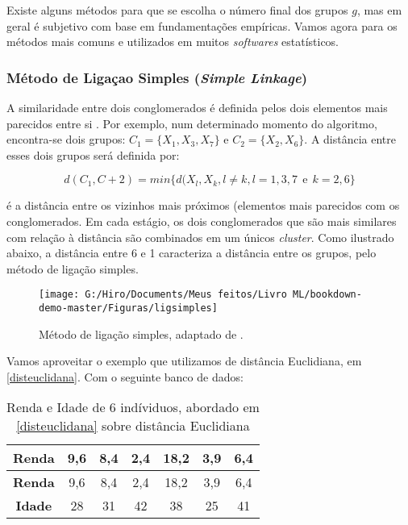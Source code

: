 \documentclass[
]{book}
\begin{document}
Existe alguns métodos para que se escolha o número final dos grupos \(g\), mas em geral é subjetivo com base em fundamentações empíricas. Vamos agora para os métodos mais comuns e utilizados em muitos \emph{softwares} estatísticos.

\hypertarget{muxe9todo-de-ligauxe7ao-simples-simple-linkage}{%
\subsubsection{\texorpdfstring{Método de Ligaçao Simples (\emph{Simple Linkage})}{Método de Ligaçao Simples (Simple Linkage)}}\label{muxe9todo-de-ligauxe7ao-simples-simple-linkage}}

A similaridade entre dois conglomerados é definida pelos dois elementos mais parecidos entre si \citep{sneath1957application}. Por exemplo, num determinado momento do algoritmo, encontra-se dois grupos: \(C_1=\{X_1,X_3,X_7\}\) e \(C_2=\{X_2,X_6\}\). A distância entre esses dois grupos será definida por:

\begin{equation}
    d(C_1,C+2)=min\{d(X_l,X_k, l\neq k, l=1,3,7 \ \ \mbox{e} \ \ k=2,6\}
    \label{eq:ligsimples}
\end{equation}

é a distância entre os vizinhos mais próximos (elementos mais parecidos com os conglomerados. Em cada estágio, os dois conglomerados que são mais similares com relação à distância são combinados em um únicos \emph{cluster}. Como ilustrado abaixo, a distância entre 6 e 1 caracteriza a distância entre os grupos, pelo método de ligação simples.

\begin{figure}

{\centering \texttt{[image: G:/Hiro/Documents/Meus feitos/Livro ML/bookdown-demo-master/Figuras/ligsimples]} 

}

\caption{Método de ligação simples, adaptado de \citet{mingoti2007analise}.}\label{fig:ligsimples}
\end{figure}



Vamos aproveitar o exemplo que utilizamos de distância Euclidiana, em \ref{disteuclidana}. Com o seguinte banco de dados:

\begin{longtable}[]{@{}ccccccc@{}}
\caption{\label{tab:dadossrenda} Renda e Idade de 6 indíviduos, abordado em \ref{disteuclidana} sobre distância Euclidiana \citep{mingoti2007analise}}\tabularnewline
\toprule
\textbf{Renda} & 9,6 & 8,4 & 2,4 & 18,2 & 3,9 & 6,4\tabularnewline
\midrule
\endfirsthead
\toprule
\textbf{Renda} & 9,6 & 8,4 & 2,4 & 18,2 & 3,9 & 6,4\tabularnewline
\midrule
\endhead
\textbf{Idade} & 28 & 31 & 42 & 38 & 25 & 41\tabularnewline
\bottomrule
\end{longtable}
\end{document}
